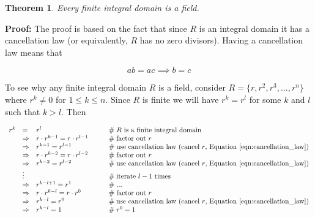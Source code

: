 \documentclass[11pt, oneside]{article}   	%
\newtheorem{thm}{Theorem}[section]
\theoremstyle{definition}
\begin{document}
\bigskip
\begin{thm}
Every finite integral domain is a field.
\label{thm:finite_id_is_a_field}
\end{thm}

\noindent
\textbf{Proof:}  The proof is based on the fact that since $R$ is an integral domain it has a cancellation law (or equivalently, $R$ has no zero divisors). 
Having a cancellation law means that

\begin{equation}
ab = ac \implies b = c
\label{eqn:cancellation_law}
\end{equation}


\bigskip
\noindent
To see why any finite integral domain $R$ is a field, consider $R = \{r, r^2, r^3, \hdots, r^n\}$  where 
$r^k \neq 0$ for $1 \leq k \leq n$.  Since $R$ is finite we will have $r^k = r^l$ for some $k$ and $l$ such that $k > l$. Then

\bigskip
\begin{equation*}
\begin{array}{rlll} 
r^k 
&=& r^l                                                                                        &    \qquad \mathrel{\#} \text{$R$ is a finite integral domain}        \\
&\Rightarrow& r \cdot r^{k-1} = r \cdot r^{l -1}                             &    \qquad \mathrel{\#} \text{factor out $r$}                                  \\
&\Rightarrow& r^{k-1} = r^{l -1}                                                   &    \qquad\mathrel{\#} \text{use cancellation law (cancel $r$, Equation \ref{eqn:cancellation_law}})    \\
&\Rightarrow& r \cdot r^{k-2} = r \cdot r^{l -2}                             &    \qquad\mathrel{\#} \text{factor out $r$}                                   \\
&\Rightarrow& r^{k-2} = r^{l -2}                                                   &    \qquad\mathrel{\#} \text{use cancellation law (cancel $r$, Equation \ref{eqn:cancellation_law})}  \\
&\vdots                                                                                        && \qquad\mathrel{\#} \text{iterate $l - 1$ times}                          \\    
&\Rightarrow& r^{k - l + 1} = r^1                                                 &     \qquad\mathrel{\#} \text{...}                                                    \\       
&\Rightarrow& r \cdot r^{k - l} = r \cdot r^0                                 &     \qquad\mathrel{\#} \text{factor out $r$}                                   \\    
&\Rightarrow& r^{k-l} = r^{0}                                                       &    \qquad\mathrel{\#} \text{use cancellation law (cancel $r$, Equation \ref{eqn:cancellation_law})}   \\   
&\Rightarrow& r^{k-l} = 1                                                            &     \qquad\mathrel{\#} r^0 = 1
\end{array}
\end{equation*}
\end{document}
